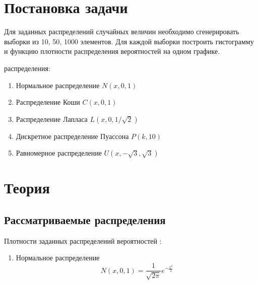 \documentclass[12pt]{article}
\newcommand{\lskip}{\hfill\break}
\begin{document}
\begin{flushleft}

\setlength{\parindent}{1cm}

\tableofcontents

\newpage

\listoffigures

\newpage

\section{Постановка задачи}

Для заданных распределений случайных величин необходимо сгенерировать выборки из 10, 50, 1000 элементов. Для каждой выборки построить гистограмму и функцию плотности распределения вероятностей на одном графике.
\lskip

 распределения:

\begin{enumerate}
    \item Нормальное распределение $N(x, 0, 1)$
    \item Распределение Коши $C(x, 0, 1)$
    \item Распределение Лапласа $L(x, 0, 1/\sqrt{2})$
    \item Дискретное распределение Пуассона $P(k, 10)$
    \item Равномерное распределение $U(x, -\sqrt{3}, \sqrt{3})$
\end{enumerate}

\newpage

\section{Теория}

    \subsection{Рассматриваемые распределения}

        Плотности заданных распределений вероятностей \cite{theory}:

        \begin{enumerate}
            \item Нормальное распределение 
            \begin{equation}
                N(x, 0, 1) = \frac{1}{\sqrt{2\pi}}e^{-\frac{x^2}{2}}
                \label{normal}
            \end{equation}


\end{enumerate}
\end{flushleft}
\end{document}
